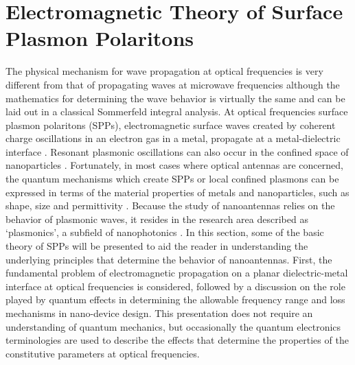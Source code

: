 \section{Electromagnetic Theory of Surface Plasmon Polaritons}
%
The physical mechanism for wave propagation at optical frequencies is very different from that of propagating waves at microwave frequencies although the mathematics for determining the wave behavior is virtually the same and can be laid out in a classical Sommerfeld integral analysis. At optical frequencies surface plasmon polaritons (SPPs), electromagnetic surface waves created by coherent charge oscillations in an electron gas in a metal, propagate at a metal-dielectric interface \cite{Ritchie1957,otto1976spectroscopy, Raether1988}. Resonant plasmonic oscillations can also occur in the confined space of nanoparticles \cite{Nie1997}. Fortunately, in most cases where optical antennas are concerned, the quantum mechanisms which create SPPs or local confined plasmons can be expressed in terms of the material properties of metals and nanoparticles, such as shape, size and permittivity \cite{Kelly2003}. Because the study of nanoantennas relies on the behavior of
plasmonic waves, it resides in the research area described as `plasmonics', a
subfield of nanophotonics \cite{Maier2005, Park2009}. In this section, some of the basic theory of SPPs will be presented to aid the reader in understanding the underlying principles that determine the behavior of nanoantennas. First, the fundamental problem of electromagnetic propagation on a planar dielectric-metal interface at optical frequencies is considered, followed by a discussion on the role played by quantum effects in determining the allowable frequency range and loss mechanisms in nano-device design. This presentation does not require an understanding of quantum mechanics, but occasionally the quantum electronics terminologies are used to describe the effects that determine the properties of the constitutive parameters at optical frequencies.
%
%
%
%
